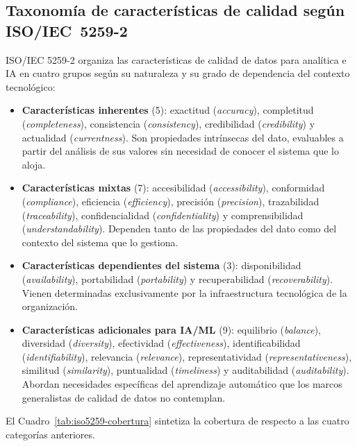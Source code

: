 \subsection{Taxonomía de características de calidad según \mbox{ISO/IEC 5259-2}}
\label{sec:taxonomia-iso5259}

\ac{ISO}/IEC 5259-2 organiza las características de calidad de datos para
analítica e \ac{IA} en cuatro grupos según su naturaleza y su grado de
dependencia del contexto tecnológico:

\begin{itemize}
  \item \textbf{Características inherentes} (5): exactitud
    (\emph{accuracy}), completitud (\emph{completeness}), consistencia
    (\emph{consistency}), credibilidad (\emph{credibility}) y actualidad
    (\emph{currentness}). Son propiedades intrínsecas del dato, evaluables
    a partir del análisis de sus valores sin necesidad de conocer el sistema
    que lo aloja.

  \item \textbf{Características mixtas} (7): accesibilidad
    (\emph{accessibility}), conformidad (\emph{compliance}), eficiencia
    (\emph{efficiency}), precisión (\emph{precision}), trazabilidad
    (\emph{traceability}), confidencialidad (\emph{confidentiality}) y
    comprensibilidad (\emph{understandability}). Dependen tanto de las
    propiedades del dato como del contexto del sistema que lo gestiona.

  \item \textbf{Características dependientes del sistema} (3):
    disponibilidad (\emph{availability}), portabilidad (\emph{portability})
    y recuperabilidad (\emph{recoverability}). Vienen determinadas
    exclusivamente por la infraestructura tecnológica de la organización.

  \item \textbf{Características adicionales para IA/ML} (9): equilibrio
    (\emph{balance}), diversidad (\emph{diversity}), efectividad
    (\emph{effectiveness}), identificabilidad (\emph{identifiability}),
    relevancia (\emph{relevance}), representatividad
    (\emph{representativeness}), similitud (\emph{similarity}), puntualidad
    (\emph{timeliness}) y auditabilidad (\emph{auditability}). Abordan
    necesidades específicas del aprendizaje automático que los marcos
    generalistas de calidad de datos no contemplan.
\end{itemize}

El Cuadro~\ref{tab:iso5259-cobertura} sintetiza la cobertura de \dataqual
respecto a las cuatro categorías anteriores.

